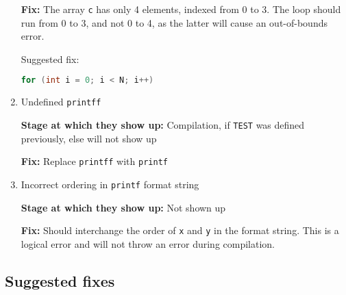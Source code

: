 \begin{enumerate}
            \textbf{Fix:}
            The array \texttt{c} has only 4 elements, indexed from 0 to 3.
            The loop should run from 0 to 3, and not 0 to 4, as the latter will cause an out-of-bounds error.

            Suggested fix:
            \begin{lstlisting}[language=C, frame=single]
for (int i = 0; i < N; i++)
            \end{lstlisting}

      \item Undefined \texttt{printff}

            \textbf{Stage at which they show up:}
            Compilation, if \texttt{TEST} was defined previously, else will not show up

            \textbf{Fix:}
            Replace \texttt{printff} with \texttt{printf}

      \item Incorrect ordering in \texttt{printf} format string

            \textbf{Stage at which they show up:}
            Not shown up

            \textbf{Fix:}
            Should interchange the order of \texttt{x} and \texttt{y} in the format string.
            This is a logical error and will not throw an error during compilation.

\end{enumerate}

\subsection*{Suggested fixes}


